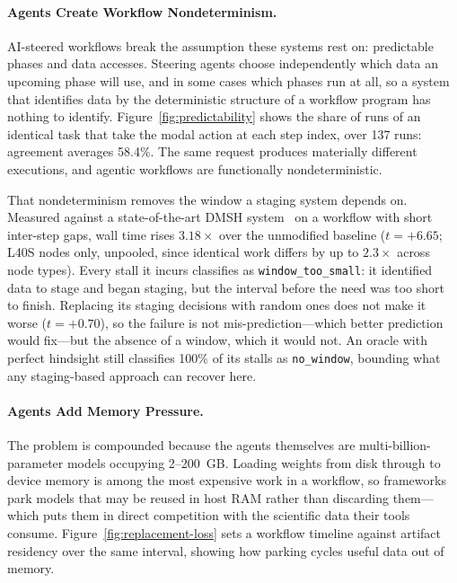 \paragraph{Agents Create Workflow Nondeterminism.}
AI-steered workflows break the assumption these systems rest on: predictable
phases and data accesses. Steering agents choose independently which data an
upcoming phase will use, and in some cases which phases run at all, so a
system that identifies data by the deterministic structure of a workflow
program has nothing to identify. Figure~\ref{fig:predictability} shows the
share of runs of an identical task that take the modal action at each step
index, over 137 runs: agreement averages 58.4\%. The same request produces
materially different executions, and agentic workflows are functionally
nondeterministic.

That nondeterminism removes the window a staging system depends on. Measured
against a state-of-the-art DMSH system~\cite{megammap} on a workflow with short
inter-step
gaps, wall time rises $3.18\times$ over the unmodified baseline ($t = +6.65$;
L40S nodes only, unpooled, since identical work differs by up to $2.3\times$
across node types). Every stall it incurs classifies as
\texttt{window\_too\_small}: it identified data to stage and began staging, but
the interval before the need was too short to finish. Replacing its staging
decisions with random ones does not make it worse ($t = +0.70$), so the
failure is not mis-prediction---which better prediction would fix---but the
absence of a window, which it would not. An oracle with perfect hindsight
still classifies 100\% of its stalls as \texttt{no\_window}, bounding what any
staging-based approach can recover here.

\paragraph{Agents Add Memory Pressure.}
The problem is compounded because the agents themselves are
multi-billion-parameter models occupying 2--200~GB. Loading weights from disk
through to device memory is among the most expensive work in a workflow, so
frameworks park models that may be reused in host RAM rather than discarding
them---which puts them in direct competition with the scientific data their
tools consume. Figure~\ref{fig:replacement-loss} sets a workflow timeline
against artifact residency over the same interval, showing how parking cycles
useful data out of memory.

